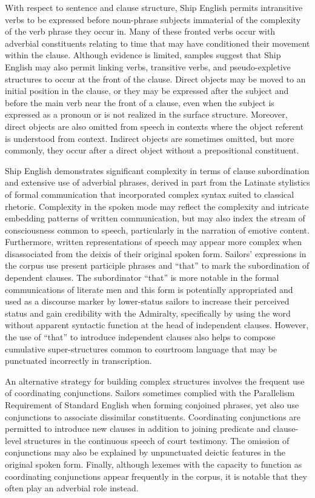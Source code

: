   With respect to sentence and clause structure, Ship English permits intransitive verbs to be expressed before noun-phrase subjects immaterial of the complexity of the verb phrase they occur in. Many of these fronted verbs occur with adverbial constituents relating to time that may have conditioned their movement within the clause. Although evidence is limited, samples suggest that Ship English may also permit linking verbs, transitive verbs, and pseudo-expletive structures to occur at the front of the clause. Direct objects may be moved to an initial position in the clause, or they may be expressed after the subject and before the main verb near the front of a clause, even when the subject is expressed as a pronoun or is not realized in the surface structure. Moreover, direct objects are also omitted from speech in contexts where the object referent is understood from context.  Indirect objects are sometimes omitted, but more commonly, they occur after a direct object without a prepositional constituent. 

  Ship English demonstrates significant complexity in terms of clause subordination and extensive use of adverbial phrases, derived in part from the Latinate stylistics of formal communication that incorporated complex syntax suited to classical rhetoric. Complexity in the spoken mode may reflect the complexity and intricate embedding patterns of written communication, but may also index the stream of consciousness common to speech, particularly in the narration of emotive content. Furthermore, written representations of speech may appear more complex when disassociated from the deixis of their original spoken form. Sailors’ expressions in the corpus use present participle phrases and “that” to mark the subordination of dependent clauses. The subordinator “that” is more notable in the formal communications of literate men and this form is potentially appropriated and used as a discourse marker by lower-status sailors to increase their perceived status and gain credibility with the Admiralty, specifically by using the word without apparent syntactic function at the head of independent clauses. However, the use of “that” to introduce independent clauses also helps to compose cumulative super-structures common to courtroom language that may be punctuated incorrectly in transcription. 

An alternative strategy for building complex structures involves the frequent use of coordinating conjunctions. Sailors sometimes complied with the Parallelism Requirement of Standard English when forming conjoined phrases, yet also use conjunctions to associate dissimilar constituents. Coordinating conjunctions are permitted to introduce new clauses in addition to joining predicate and clause-level structures in the continuous speech of court testimony. The omission of conjunctions may also be explained by unpunctuated deictic features in the original spoken form. Finally, although lexemes with the capacity to function as coordinating conjunctions appear frequently in the corpus, it is notable that they often play an adverbial role instead. 

